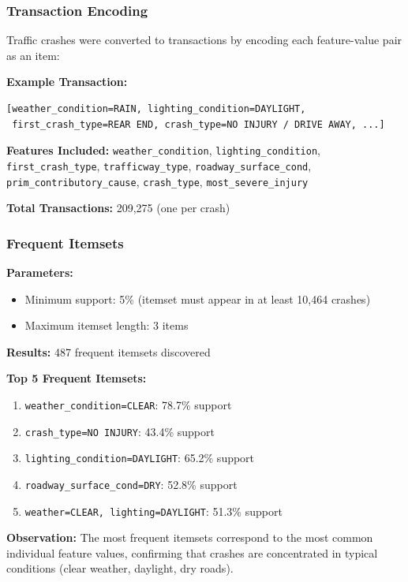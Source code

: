 \documentclass[12pt,man]{apa7}
\begin{document}
\subsubsection{Transaction Encoding}

Traffic crashes were converted to transactions by encoding each feature-value pair as an item:

\textbf{Example Transaction:}
\begin{verbatim}
[weather_condition=RAIN, lighting_condition=DAYLIGHT,
 first_crash_type=REAR END, crash_type=NO INJURY / DRIVE AWAY, ...]
\end{verbatim}

\textbf{Features Included:} \texttt{weather\_condition}, \texttt{lighting\_condition}, \texttt{first\_crash\_type}, \texttt{trafficway\_type}, \texttt{roadway\_surface\_cond}, \texttt{prim\_contributory\_cause}, \texttt{crash\_type}, \texttt{most\_severe\_injury}

\textbf{Total Transactions:} 209,275 (one per crash)

\subsubsection{Frequent Itemsets}

\textbf{Parameters:}
\begin{itemize}
    \item Minimum support: 5\% (itemset must appear in at least 10,464 crashes)
    \item Maximum itemset length: 3 items
\end{itemize}

\textbf{Results:} 487 frequent itemsets discovered

\textbf{Top 5 Frequent Itemsets:}
\begin{enumerate}
    \item \texttt{weather\_condition=CLEAR}: 78.7\% support
    \item \texttt{crash\_type=NO INJURY}: 43.4\% support
    \item \texttt{lighting\_condition=DAYLIGHT}: 65.2\% support
    \item \texttt{roadway\_surface\_cond=DRY}: 52.8\% support
    \item \texttt{weather=CLEAR, lighting=DAYLIGHT}: 51.3\% support
\end{enumerate}

\textbf{Observation:} The most frequent itemsets correspond to the most common individual feature values, confirming that crashes are concentrated in typical conditions (clear weather, daylight, dry roads).
\end{document}
